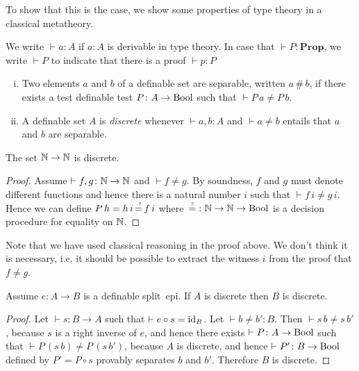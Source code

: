 \documentclass{llncs}
\newcommand{\prop}{\mathbf{Prop}}
\newcommand{\eqqm}{\stackrel{\text{\tiny ?}}{\,=\,}}
\newcommand{\sep}{\,\#\,}
\begin{document}
To show that this is the case, we show some properties of type theory in a classical metatheory.

We write $\vdash a\colon A$ if $a\colon A$ is derivable in type theory. In case that $\vdash P\colon \prop$, we write $\vdash P$ to indicate that there is a proof $\vdash p\colon P$
\begin{definition}\hfill
\begin{enumerate}[i.]
\item Two elements $a$ and $b$ of a definable set are separable, written $a\sep b$, if there exists a test definable test $P\colon A\to \mathrm{Bool}$ such that $\vdash P\,a\neq P\,b$. 
\item A definable set $A$ is \emph{discrete} whenever $\vdash a, b\colon A$ and   $\vdash a\not= b$
entails that $a$ and $b$ are separable.
\end{enumerate}
\end{definition}
\begin{proposition}\label{prop:NtoNdiscrete}
The set $\mathbb {N}\to\mathbb {N}$ is discrete. 
\end{proposition}
\begin{proof}
Assume $\vdash f, g\colon \mathbb {N} \to \mathbb {N}$ and $\vdash f\neq g$. By soundness, $f$ and $g$ must denote different functions and hence there is a natural number $i$ such that $\vdash f\,i\neq g\,i$. Hence we can define $P\,h = h\,i{\eqqm}f\,i$ where ${\eqqm}\colon \nat\to\nat\to\bool$ is a decision procedure for equality on $\mathbb {N}$. 
\end{proof}

Note that we have used classical reasoning in the proof above. We don't think it is necessary, i.e. it should be possible to extract the witness $i$ from the proof that $f\neq g$.

\begin{proposition}\label{prop:splitepidiscrete}
Assume $ e\colon A\to B$ is a definable split~epi.  If $A$ is discrete then $B$ is discrete.
\end{proposition}
\begin{proof}
Let $\vdash s\colon B\to A$ such that $\vdash e\circ s=\operatorname{id}_B$. Let $\vdash b\neq b'\colon B$. Then $\vdash s\,b\neq s\,b'$, because $s$ is a right inverse of $e$, and hence there exists $\vdash P\colon A\to\mathrm{Bool}$ such that $\vdash P\,(s\,b)\neq P\,(s\,b')$, because $A$ is discrete, and hence $\vdash P'\colon B\to\mathrm{Bool}$ defined by $P' = P\circ s$ provably separates $b$ and $b'$.
Therefore $B$ is discrete.
\end{proof}
\end{document}

